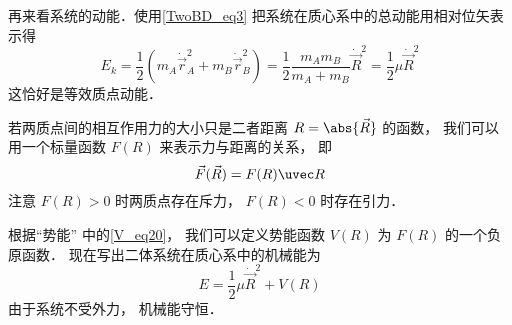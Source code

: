 再来看系统的动能．使用\autoref{TwoBD_eq3} 把系统在质心系中的总动能用相对位矢表示得
\begin{equation}
E_k = \frac12 (m_A \dot{\vec r}_A^2 + m_B \dot{\vec r}_B^2) = \frac12 \frac{m_A m_B}{m_A + m_B} \dot{\vec  R}^2 = \frac12 \mu \dot{\vec  R}^2
\end{equation}
这恰好是等效质点动能．

若两质点间的相互作用力的大小只是二者距离 $R = \abs{\vec R}$ 的函数， 我们可以用一个标量函数 $F(R)$ 来表示力与距离的关系， 即
\begin{equation}
\vec F(\vec R) = F(R) \uvec R
\end{equation}
注意 $F(R)>0$ 时两质点存在斥力， $F(R)<0$ 时存在引力．

根据“势能” 中的\autoref{V_eq20}， 我们可以定义势能函数 $V(R)$ 为 $F(R)$ 的一个负原函数． 现在写出二体系统在质心系中的机械能为
\begin{equation}
E = \frac12 \mu \dot{\vec  R}^2 + V(R)
\end{equation}
由于系统不受外力， 机械能守恒．